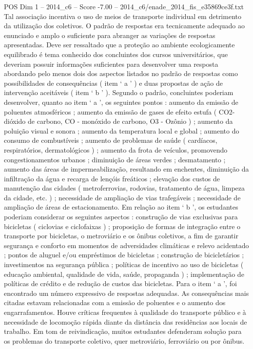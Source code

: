 \begin{textsample}{POS Dim 1 – 2014\_c6 – Score -7.00 – 2014\_c6/enade\_2014\_fis\_e35869ce3f.txt}
Tal associação incentiva o uso de meios de transporte individual em detrimento da utilização dos coletivos.
O padrão de respostas era tecnicamente adequado ao enunciado e amplo o suficiente para abranger as variações de respostas apresentadas.
Deve ser ressaltado que a proteção ao ambiente ecologicamente equilibrado é tema conhecido dos concluintes dos cursos universitários, que deveriam possuir informações suficientes para desenvolver uma resposta abordando pelo menos dois dos aspectos listados no padrão de respostas como possibilidades de consequências ( item ‘ a ’ ) e duas propostas de ação de intervenção aceitáveis ( item ‘ b ’ ).
Segundo o padrão, concluintes poderiam desenvolver, quanto ao item ‘ a ’, os seguintes pontos : aumento da emissão de poluentes atmosféricos ; aumento da emissão de gases de efeito estufa ( CO2- dióxido de carbono, CO - monóxido de carbono, O3 - Ozônio ) ; aumento da poluição visual e sonora ; aumento da temperatura local e global ; aumento do consumo de combustíveis ; aumento de problemas de saúde ( cardíacos, respiratórios, dermatológicos ) ; aumento da frota de veículos, promovendo congestionamentos urbanos ; diminuição de áreas verdes ; desmatamento ; aumento das áreas de impermeabilização, resultando em enchentes, diminuição da infiltração da água e recarga de lençóis freáticos ; elevação dos custos de manutenção das cidades ( metroferrovias, rodovias, tratamento de água, limpeza da cidade, etc. ) ; necessidade de ampliação de vias trafegáveis ; necessidade de ampliação de áreas de estacionamento.
Em relação ao item ‘ b ’, os estudantes poderiam considerar os seguintes aspectos : construção de vias exclusivas para bicicletas ( ciclovias e ciclofaixas ) ; proposição de formas de integração entre o transporte por bicicletas, o metroviário e os ônibus coletivos, a fim de garantir segurança e conforto em momentos de adversidades climáticas e relevo acidentado ; pontos de aluguel e/ou empréstimos de bicicletas ; construção de bicicletários ; investimentos na segurança pública ; políticas de incentivo ao uso de bicicletas ( educação ambiental, qualidade de vida, saúde, propaganda ) ; implementação de políticas de crédito e de redução de custos das bicicletas.
Para o item ‘ a ’, foi encontrado um número expressivo de respostas adequadas.
As consequências mais citadas estavam relacionadas com a emissão de poluentes e o aumento dos engarrafamentos.
Houve críticas frequentes à qualidade do transporte público e à necessidade de locomoção rápida diante da distância das residências aos locais de trabalho.
Em tom de reivindicação, muitos estudantes defenderam solução para os problemas do transporte coletivo, quer metroviário, ferroviário ou por ônibus.

\end{textsample}

